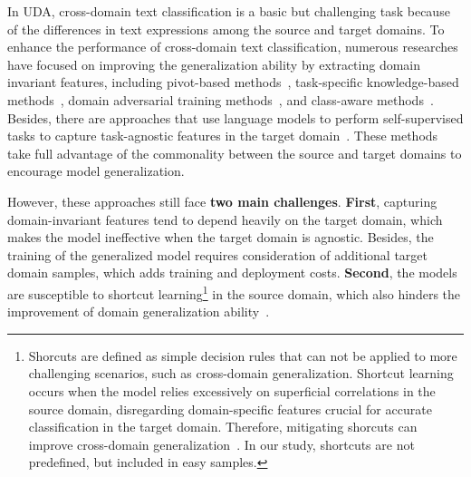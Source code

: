 \documentclass[letterpaper]{article} %
\begin{document}
In UDA, cross-domain text classification is a basic but challenging task because of the differences in text expressions among the source and target domains. To enhance the performance of cross-domain text classification, numerous researches have focused on improving the generalization ability by extracting domain invariant features, including pivot-based methods~\cite{ZiserR18, ZhangHPJ18, Ben-DavidRR20}, task-specific knowledge-based methods~\cite{ZhouTWWXH20}, domain adversarial training methods~\cite{WuS22}, and class-aware methods~\cite{YeTHLNB20, LuoGL022}. Besides, there are approaches that use language models to perform self-supervised tasks to capture task-agnostic features in the target domain~\cite{KarouzosPP21}. These methods take full advantage of the commonality between the source and target domains to encourage model generalization.

However, these approaches still face \textbf{two main challenges}. \textbf{First}, capturing domain-invariant features tend to depend heavily on the target domain, which makes the model ineffective when the target domain is agnostic. Besides, the training of the generalized model requires consideration of additional target domain samples, which adds training and deployment costs. \textbf{Second}, the models are susceptible to shortcut learning\footnote{Shorcuts are defined as simple decision rules that can not be applied to more challenging scenarios, such as cross-domain generalization. Shortcut learning occurs when the model relies excessively on superficial correlations in the source domain, disregarding domain-specific features crucial for accurate classification in the target domain. Therefore, mitigating shorcuts can improve cross-domain generalization~\cite{MoonMLLS21}. In our study, shortcuts are not predefined, but included in easy samples. } in the source domain, which also hinders the improvement of domain generalization ability~\cite{GeirhosJMZBBW20, Yunlong2023}. 
\end{document}
